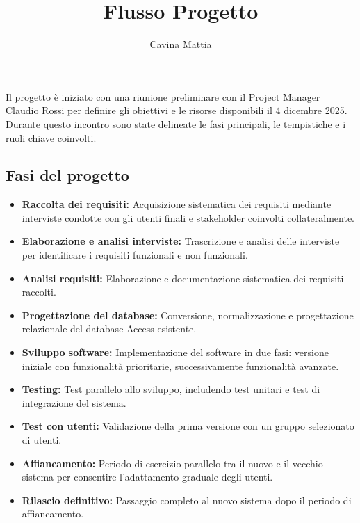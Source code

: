 \documentclass[12pt, a4paper]{article}
\title{Flusso Progetto}
\author{Cavina Mattia}
\begin{document}
Il progetto è iniziato con una riunione preliminare con il Project Manager Claudio Rossi per definire gli obiettivi e le risorse disponibili il 4 dicembre 2025.
Durante questo incontro sono state delineate le fasi principali, le tempistiche e i ruoli chiave coinvolti.

\subsection{Fasi del progetto}
\begin{itemize}
      \item \textbf{Raccolta dei requisiti:} Acquisizione sistematica dei requisiti mediante interviste condotte con gli utenti finali e stakeholder coinvolti collateralmente.
      \item \textbf{Elaborazione e analisi interviste:} Trascrizione e analisi delle interviste per identificare i requisiti funzionali e non funzionali.
      \item \textbf{Analisi requisiti:} Elaborazione e documentazione sistematica dei requisiti raccolti.
      \item \textbf{Progettazione del database:} Conversione, normalizzazione e progettazione relazionale del database Access esistente.
      \item \textbf{Sviluppo software:} Implementazione del software in due fasi: versione iniziale con funzionalità prioritarie, successivamente funzionalità avanzate.
      \item \textbf{Testing:} Test parallelo allo sviluppo, includendo test unitari e test di integrazione del sistema.
      \item \textbf{Test con utenti:} Validazione della prima versione con un gruppo selezionato di utenti.
      \item \textbf{Affiancamento:} Periodo di esercizio parallelo tra il nuovo e il vecchio sistema per consentire l'adattamento graduale degli utenti.
      \item \textbf{Rilascio definitivo:} Passaggio completo al nuovo sistema dopo il periodo di affiancamento.
\end{itemize}
\end{document}
